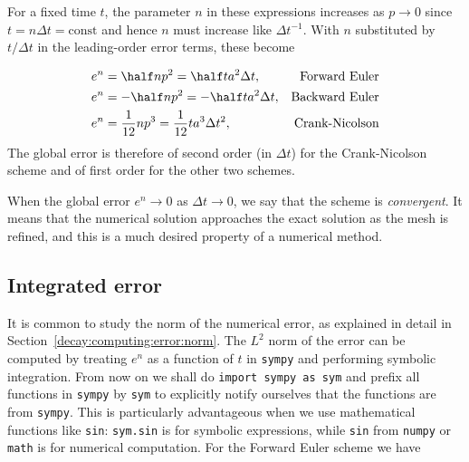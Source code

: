 \documentclass[graybox,sectrefs,envcountresetchap,open=right,final]{svmonodo}
\newenvironment{notice_mdfboxadmon}[1][]{
\begin{notice_mdfboxmdframed}[frametitle=#1]
}
{
\end{notice_mdfboxmdframed}
}
\begin{document}
For a fixed time $t$, the parameter $n$ in these expressions increases
as $p\rightarrow 0$ since $t=n\Delta t =\mbox{const}$ and hence
$n$ must increase like $\Delta t^{-1}$. With $n$ substituted by
$t/\Delta t$ in
the leading-order error terms, these become

\begin{align}
e^n &= \half n p^2 = {\half}ta^2\Delta t, &\hbox{Forward Euler}
\label{decay:analysis:gobal:error:FE}\\ 
e^n &= -\half n p^2 = -{\half}ta^2\Delta t, &\hbox{Backward Euler}
\label{decay:analysis:gobal:error:BE}\\ 
e^n &= \frac{1}{12}np^3 = \frac{1}{12}ta^3\Delta t^2, &\hbox{Crank-Nicolson}
\label{decay:analysis:gobal:error:CN}
\end{align}
The global error is therefore of
second order (in $\Delta t$) for the Crank-Nicolson scheme and of
first order for the other two schemes.


\begin{notice_mdfboxadmon}[Convergence]
When the global error $e^n\rightarrow 0$ as $\Delta t\rightarrow 0$,
we say that the scheme is \emph{convergent}. It means that the numerical
solution approaches the exact solution as the mesh is refined, and
this is a much desired property of a numerical method.
\end{notice_mdfboxadmon} %



\subsection{Integrated error}
\label{decay:analysis:gobal:error_int}

It is common to study the norm of the numerical error, as
explained in detail in Section~\ref{decay:computing:error:norm}.
The $L^2$ norm of the error can be computed by treating $e^n$ as a function
of $t$ in \texttt{sympy} and performing symbolic integration.
From now on we shall do \texttt{import sympy as sym} and prefix all functions
in \texttt{sympy} by \texttt{sym} to explicitly notify ourselves that the functions
are from \texttt{sympy}. This is particularly advantageous when we use
mathematical functions like \texttt{sin}: \texttt{sym.sin} is for symbolic expressions,
while \texttt{sin} from \texttt{numpy} or \texttt{math} is for numerical computation.
For the Forward Euler scheme we have
\end{document}
